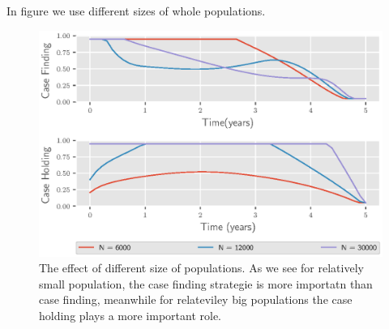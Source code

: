 In figure we use different sizes of whole populations.
\begin{figure}
\centering
\includegraphics{Figures/figure_3_two_strain_tbm}
  \caption{The effect of different size of populations. As we see for 
  relatively small population, the case finding strategie is more importatn 
  than case finding, meanwhile for relateviley big populations the case holding 
  plays a more important role.}
  \label{fig:figure3twostraintbm}
\end{figure}



 